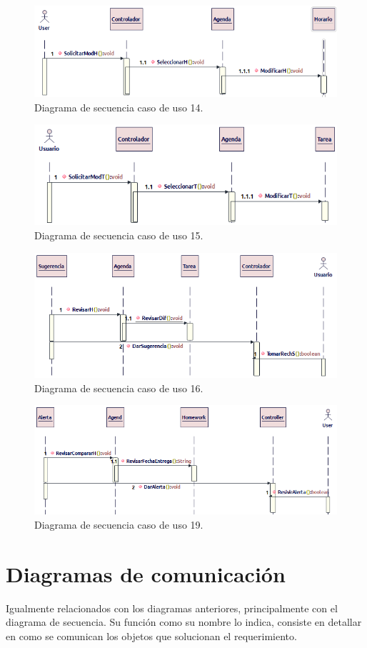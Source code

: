 \begin{figure}[H]
	\centering
	\includegraphics[width=0.7\linewidth]{diseno/requerimientos/imagenes/secuencia1}
	\caption{Diagrama de secuencia caso de uso 14.}
	\label{fig:gantt}
\end{figure}
\begin{figure}[H]
	\centering
	\includegraphics[width=0.7\linewidth]{diseno/requerimientos/imagenes/secuencia2}
	\caption{Diagrama de secuencia caso de uso 15.}
	\label{fig:gantt}
\end{figure}
\begin{figure}[H]
	\centering
	\includegraphics[width=0.7\linewidth]{diseno/requerimientos/imagenes/secuencia3}
	\caption{Diagrama de secuencia caso de uso 16.}
	\label{fig:gantt}
\end{figure}
\begin{figure}[H]
	\centering
	\includegraphics[width=0.7\linewidth]{diseno/requerimientos/imagenes/secuencia4}
	\caption{Diagrama de secuencia caso de uso 19.}
	\label{fig:gantt}
\end{figure}

\section{Diagramas de comunicación}
Igualmente relacionados con los diagramas anteriores, principalmente con el diagrama de secuencia. Su función como su nombre lo indica, consiste en detallar en como se comunican los objetos que solucionan el requerimiento.

